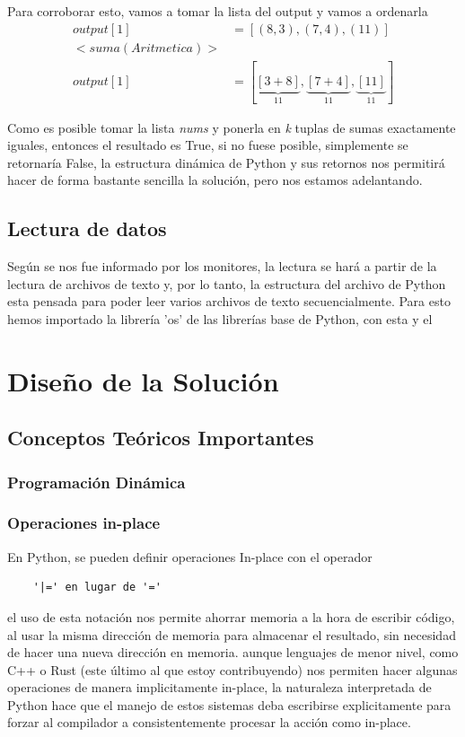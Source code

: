 \documentclass[a4paper]{article}
\begin{document}
Para corroborar esto, vamos a tomar la lista del output y vamos a ordenarla
\begin{align*}
    output[1] &= [(8,3), (7,4), (11)] \\
    <suma (Aritmetica)> \\
    output[1] &= [\underset{11}{\underbrace{[3 + 8]}},
    \underset{11}{\underbrace{[7 + 4]}},
    \underset{11}{\underbrace{[11]}}]
\end{align*} 

Como es posible tomar la lista \textit{nums} y ponerla en \textit{k} tuplas de
sumas exactamente iguales, entonces el resultado es True, si no fuese posible, simplemente
se retornaría False, la estructura dinámica de Python y sus retornos nos permitirá hacer
de forma bastante sencilla la solución, pero nos estamos adelantando.

\subsection{Lectura de datos}
Según se nos fue informado por los monitores, la lectura se hará a partir de la lectura
de archivos de texto y, por lo tanto, la estructura del archivo de Python esta pensada para
poder leer varios archivos de texto secuencialmente. Para esto hemos importado la librería 'os'
de las librerías base de Python, con esta y el 
\section{Diseño de la Solución}
\subsection{Conceptos Teóricos Importantes}
\subsubsection{Programación Dinámica}

\subsubsection{Operaciones in-place}
En Python, se pueden definir operaciones In-place con el operador 
\begin{verbatim}
    '|=' en lugar de '='
\end{verbatim}
el uso de esta notación nos permite ahorrar
memoria a la hora de escribir código, al usar la misma dirección de memoria para
almacenar el resultado, sin necesidad de hacer una nueva dirección en memoria. aunque
lenguajes de menor nivel, como C++ o Rust (este último al que estoy contribuyendo) nos
permiten hacer algunas operaciones de manera implicitamente in-place, la naturaleza 
interpretada de Python hace que el manejo de estos sistemas deba escribirse explicitamente
para forzar al compilador a consistentemente procesar la acción como in-place.
\end{document}
